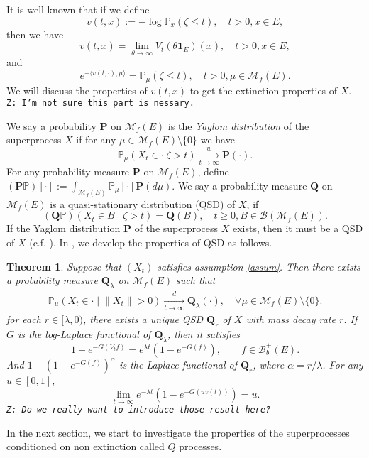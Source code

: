 \documentclass[12pt,a4paper]{amsart}
\numberwithin{equation}{section}
\theoremstyle{plain}
\newtheorem{thm}{Theorem}[section]
\theoremstyle{definition}
\theoremstyle{remark}
\begin{document}
It is well known that if we define
\[
	v(t,x):= -\log \mathbb P_x(\zeta \leq t), \quad t > 0, x\in E,
\]
then we have
\[
	v(t,x)
	= \lim_{\theta \to \infty} V_t(\theta \mathbf 1_E)(x),
	\quad t>0, x\in E,
\]
	and
\begin{equation}
\label{eq: v and extinction}
	e^{-\langle v(t,\cdot), \mu \rangle}
	= \mathbb P_\mu(\zeta \leq t), \quad t>0, \mu \in \mathcal M_f(E).
\end{equation}
We will discuss the properties of $v(t,x)$ to get the extinction properties of $X$.
{\tt Z: I'm not sure this part is nessary.}

We say a probability ${\mathbf P}$ on $\mathcal M_f(E)$ is the \emph{Yaglom distribution} of the superprocess $X$ if for any $\mu\in \mathcal M_f(E)\setminus\{0\}$ we have
\[
  \mathbb P_\mu(X_t \in \cdot | \zeta > t) \xrightarrow[t\to \infty]{w} {\mathbf P}(\cdot).
\]
For any probability measure $\mathbf P$ on $\mathcal M_f(E)$, define $(\mathbf P\mathbb P)[\cdot] := \int_{\mathcal M_f(E)} \mathbb P_\mu[\cdot] \mathbf P(d\mu)$.  We say a probability measure $\mathbf Q$ on $\mathcal M_f(E)$ is a quasi-stationary distribution (QSD) of $X$, if
	\[
	(\mathbf Q \mathbb P) \left( X_t \in B \middle | \zeta>t \right) = \mathbf Q(B), \quad t\geq 0, B \in \mathcal B(\mathcal M_f(E)).
	\]
If the Yaglom distribution ${\mathbf P}$ of the superprocess $X$ exists, then it must be a QSD of $X$ (c.f. \cite{MeleardVillemonais2012Quasi-stationary}).
In \cite{LSRS}, we develop the properties of QSD as follows.
\begin{thm} \label{Yaglom}
	Suppose that $(X_t)$ satisfies assumption \ref{assum}.	Then there exists a probability measure $\mathbf Q_\lambda$ on $\mathcal M_f(E)$ such that
\begin{align}
 	\mathbb P_\mu \left(X_t \in \cdot \middle| \|X_t\| > 0 \right)
 	\xrightarrow[t\to \infty]{d} \mathbf Q_\lambda(\cdot),
 	\quad \forall \mu \in \mathcal M_f(E)\setminus \{0\}.
\end{align}
for each $r \in [\lambda, 0)$, there exists a unique QSD $\mathbf Q_r$ of $X$ with mass decay rate $r$. If $G$ is the log-Laplace functional of $\mathbf Q_\lambda$, then it satisfies
\begin{equation}\label{ll}
1-e^{-G(V_tf)}=e^{\lambda t}(1-e^{-G(f)}), \qquad f\in\mathcal B_b^+(E).
\end{equation}
And $1-\left(1-e^{-G(f)}\right)^\alpha$ is the Laplace functional of $\mathbf Q_r$, where $\alpha=r/\lambda$.  For any $u\in [0,1]$,
\begin{equation}\label{tail of L}
\lim_{t\to\infty}e^{-\lambda t}\left(1-e^{-G(uv(t))}\right)=u.
\end{equation}
	{\tt Z: Do we really want to introduce those result here?}
\end{thm}
In the next section, we start to investigate the properties of the superprocesses conditioned on non extinction called $Q$ processes.
\end{document}
